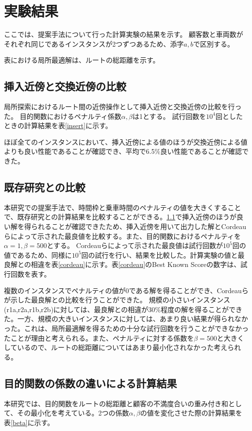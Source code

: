 \section{実験結果}
ここでは、提案手法について行った計算実験の結果を示す。
顧客数と車両数がそれぞれ同じであるインスタンスが2つずつあるため、添字$a,b$で区別する。

表における局所最適解は、ルートの総距離を示す。
\subsection{挿入近傍と交換近傍の比較}
\label{sec:insert}
局所探索におけるルート間の近傍操作として挿入近傍と交換近傍の比較を行った。
目的関数におけるペナルティ係数$\alpha,\beta$は1とする。
試行回数を$10^4$回としたときの計算結果を表\ref{insert}に示す。

ほぼ全てのインスタンスにおいて、挿入近傍による値のほうが交換近傍による値よりも良い性能であることが確認でき、平均で6.5\%良い性能であることが確認できた。

\subsection{既存研究との比較}
\label{sec:cordeau}
本研究での提案手法で、時間枠と乗車時間のペナルティの値を大きくすることで、既存研究との計算結果を比較することができる。\ref{sec:insert}で挿入近傍のほうが良い解を得られることが確認できたため、挿入近傍を用いて出力した解とCordeauらによって示された最良値を比較する。また、目的関数におけるペナルティを$\alpha=1,\beta=500$とする。
Cordeauらによって示された最良値は試行回数が$10^5$回の値であるため、同様に$10^5$回の試行を行い、結果を比較した。計算実験の値と最良解との相違を表\ref{cordeau}に示す。表\ref{cordeau}のBest Known Scoreの数字は、試行回数を表す。

複数のインスタンスでペナルティの値が0である解を得ることができ、Cordeauらが示した最良解との比較を行うことができた。
規模の小さいインスタンス(r1a,r2a,r1b,r2b)に対しては、最良解との相違が30\%程度の解を得ることができた。一方、規模の大きいインスタンスに対しては、あまり良い結果が得られなかった。これは、局所最適解を得るための十分な試行回数を行うことができなかったことが理由と考えられる。また、ペナルティに対する係数を$\beta=500$と大きくしているので、ルートの総距離についてはあまり最小化されなかった考えられる。
\subsection{目的関数の係数の違いによる計算結果}
本研究では、目的関数をルートの総距離と顧客の不満度合いの重み付き和として、その最小化を考えている。2つの係数$\alpha,\beta$の値を変化させた際の計算結果を表\ref{beta}に示す。

